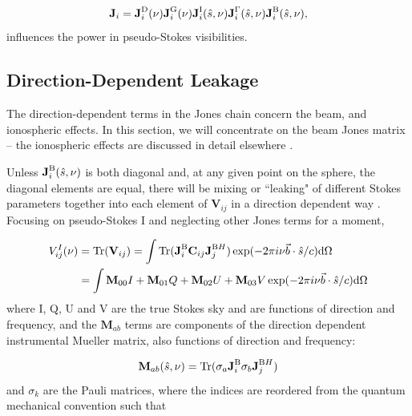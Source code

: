\begin{equation}
\textbf{J}_i = \textbf{J}_i^{\rm D}(\nu) \textbf{J}_i^{\rm G}(\nu)  \textbf{J}_i^{\rm I}(\hat{s},\nu) \textbf{J}_i^{\rm \Gamma}(\hat{s},\nu)  \textbf{J}_i^{\rm B}(\hat{s},\nu) ,
\end{equation}
influences the power in pseudo-Stokes visibilities.

\subsection{Direction-Dependent Leakage}

The direction-dependent terms in the Jones chain concern the beam, and ionospheric effects. In this section, we will concentrate on the beam Jones matrix -- the ionospheric effects are discussed in detail elsewhere \citep[e.g.][{\color{red} Martinot et al. (in prep.)}]{Intema.09,Vedantham.15,Vedantham.16}.

Unless $\textbf{J}_i^{\rm B}(\hat{s},\nu)$ is both diagonal and, at any given point on the sphere, the diagonal elements are equal, there will be mixing or ``leaking" of different Stokes parameters together into each element of $\textbf{V}_{ij}$ in a direction dependent way \citep[e.g.][]{Geil.11, Smirnov.11, Smirnov.11.2, Nunhokee.17}. Focusing on pseudo-Stokes I and neglecting other Jones terms for a moment,

\begin{equation}
\begin{split}
V^I_{ij}(\nu) &= {\rm Tr}(\textbf{V}_{ij}) = \int {\rm Tr}(\textbf{J}_i^{\rm B}\textbf{C}_{ij}\textbf{J}_j^{{\rm B}H}) \exp(-2\pi i \nu \vec{b}\cdot\hat{s}/c) {\rm d}\Omega \\
					  &= \int \textbf{M}_{00}I + \textbf{M}_{01}Q + \textbf{M}_{02}U + \textbf{M}_{03}V \exp(-2\pi i \nu \vec{b}\cdot\hat{s}/c) {\rm d}\Omega
\end{split}
\end{equation}
where I, Q, U and V are the true Stokes sky and are functions of direction and frequency, and the $\textbf{M}_{ab}$ terms are components of the direction dependent instrumental Mueller matrix, also functions of direction and frequency:

\begin{equation}
\textbf{M}_{ab}(\hat{s},\nu) = {\rm Tr} ( \sigma_a \textbf{J}_i^{\rm B} \sigma_b \textbf{J}_j^{{\rm B}H})
\end{equation}
and $\sigma_k$ are the Pauli matrices, where the indices are reordered from the quantum mechanical convention such that 

